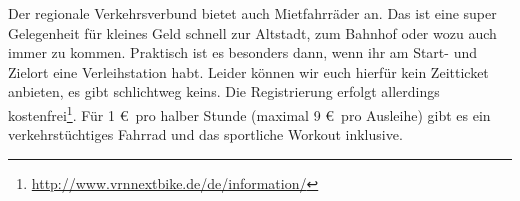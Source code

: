 Der regionale Verkehrsverbund bietet auch Mietfahrräder an. Das ist eine super Gelegenheit  für kleines Geld schnell zur Altstadt, zum Bahnhof oder wozu auch immer zu kommen.  Praktisch ist es besonders dann, wenn ihr am Start- und Zielort eine Verleihstation habt. Leider können wir euch hierfür kein Zeitticket anbieten, es gibt schlichtweg keins. Die Registrierung erfolgt allerdings kostenfrei\footnote{\url{http://www.vrnnextbike.de/de/information/}}. Für 1 \euro \, pro halber Stunde (maximal 9 \euro \, pro Ausleihe) gibt es ein verkehrstüchtiges Fahrrad und das sportliche Workout inklusive.



